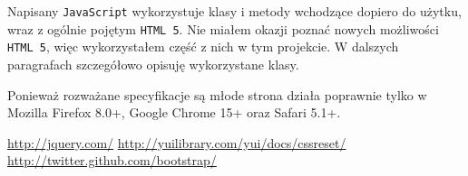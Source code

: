 \documentclass[10pt,a4paper]{article}
\newcommand{\f}[1]{\texttt{#1}}
\begin{document}
Napisany \f{JavaScript} wykorzystuje klasy i metody wchodzące dopiero do użytku,
wraz z ogólnie pojętym \f{HTML 5}. Nie miałem okazji poznać nowych możliwości
\f{HTML 5}, więc wykorzystałem część z nich w tym projekcie. W dalszych
paragrafach szczegółowo opisuję wykorzystane klasy.

Ponieważ rozważane specyfikacje są młode strona działa poprawnie tylko w Mozilla
Firefox 8.0+, Google Chrome 15+ oraz Safari 5.1+.



\begin{thebibliography}{9}
    \url{http://jquery.com/}
    \url{http://yuilibrary.com/yui/docs/cssreset/}
    \url{http://twitter.github.com/bootstrap/}
\end{thebibliography}
\end{document}
